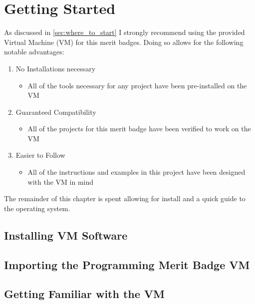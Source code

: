 \chapter{Getting Started}
\label{chap:getting_started}

  As discussed in \autoref{sec:where_to_start} I strongly recommend using the provided
    Virtual Machine (VM) for this merit badges.
  Doing so allows for the following notable advantages:

  \begin{enumerate}
    \item No Installations necessary
    \begin{itemize}
      \item All of the tools necessary for any project have been pre-installed on the VM
    \end{itemize}
    \item Guaranteed Compatibility
    \begin{itemize}
      \item All of the projects for this merit badge have been verified to work on the VM
    \end{itemize}
    \item Easier to Follow
    \begin{itemize}
      \item All of the instructions and examples in this project have been designed with the VM in mind
    \end{itemize}
  \end{enumerate}

  The remainder of this chapter is spent allowing for install and a quick guide to the operating system.

  \section{Installing VM Software}
  \label{sec:installing_vm_software}

  \section{Importing the Programming Merit Badge VM}
  \label{sec:import_merit_badge_vm}

  \section{Getting Familiar with the VM}
  \label{sec:getting_familiar_with_vm}

